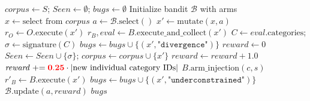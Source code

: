 \begin{algorithm}[t]
    \caption{The \tool Fuzzing Loop (unified, single-pass)}
    \begin{algorithmic}[1]
            \State $\mathit{corpus} \leftarrow S$; $\mathit{Seen} \leftarrow \emptyset$; $\mathit{bugs} \leftarrow \emptyset$
            \State Initialize bandit $\mathcal{B}$ with  arms
                \State $x \leftarrow \text{select from } \mathit{corpus}$
                \State $a \leftarrow \mathcal{B}.\text{select}()$ 
                \State $x' \leftarrow \text{mutate}(x, a)$ 
                \State $r_O \leftarrow O.\text{execute}(x')$ 
                \State $r_B, \mathit{eval} \leftarrow B.\text{execute\_and\_collect}(x')$
                \State $C \leftarrow \mathit{eval}.\text{categories}$; $\sigma \leftarrow \text{signature}(C)$
                 
                    \State $\mathit{bugs} \leftarrow \mathit{bugs} \cup \{(x', \texttt{"divergence"})\}$
                \EndIf
                \State $\mathit{reward} \leftarrow 0$
                    \State $\mathit{Seen} \leftarrow \mathit{Seen} \cup \{\sigma\}$; $\mathit{corpus} \leftarrow \mathit{corpus} \cup \{x'\}$
                    \State $\mathit{reward} \leftarrow \mathit{reward} + 1.0$
                \EndIf
                \State $\mathit{reward} \mathrel{+}= {{\color{red}{{{\bf 0.25}}}}} \cdot |\text{new individual category IDs}|$
                 
                    \State $B.\text{arm\_injection}(c, s)$ 
                    \State $r'_B \leftarrow B.\text{execute}(x')$
                        \State $\mathit{bugs} \leftarrow \mathit{bugs} \cup \{(x', \texttt{"underconstrained"})\}$
                    \EndIf
                \EndFor
                \State $\mathcal{B}.\text{update}(a, \mathit{reward})$ 
            \EndFor
            \State \Return $\mathit{bugs}$
        \EndProcedure
    \end{algorithmic}
    \label{alg:fuzzing}
\end{algorithm}

